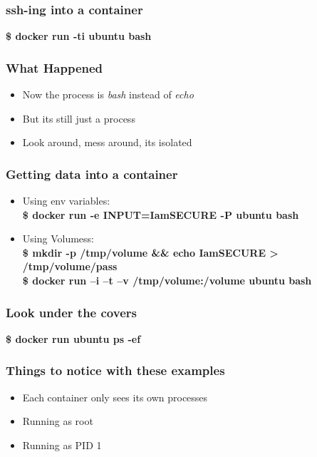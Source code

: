 \documentclass[aspectratio=169,11pt,hyperref={colorlinks=true}]{beamer}
\begin{document}
\begin{frame}
    \frametitle{ssh-ing into a container}
    {\LARGE \textbf{\$ docker run -ti ubuntu bash}}
\end{frame}

\begin{frame}
    \frametitle{What Happened}
    \begin{itemize}
        \item Now the process is \textit{bash} instead of \textit{echo}
        \item But its still just a process
        \item Look around, mess around, its isolated
    \end{itemize}
\end{frame}

\begin{frame}
    \frametitle{Getting data into a container}
    \begin{itemize}
        \item Using env variables: \\
           \textbf{\$ docker run -e INPUT=IamSECURE -P ubuntu bash}
       \item Using Volumess: \\
           \textbf{\$ mkdir -p /tmp/volume \&\& echo IamSECURE > /tmp/volume/pass}\\
           \textbf{\$ docker run –i –t –v /tmp/volume:/volume ubuntu bash}
    \end{itemize}
\end{frame}

\begin{frame}
    \frametitle{Look under the covers}
    {\LARGE \textbf{\$ docker run ubuntu ps -ef}}
\end{frame}

\begin{frame}
    \frametitle{Things to notice with these examples}
    \begin{itemize}
        \item Each container only sees its own processes
        \item Running as root
        \item Running as PID 1
    \end{itemize}
\end{frame}
\end{document}
